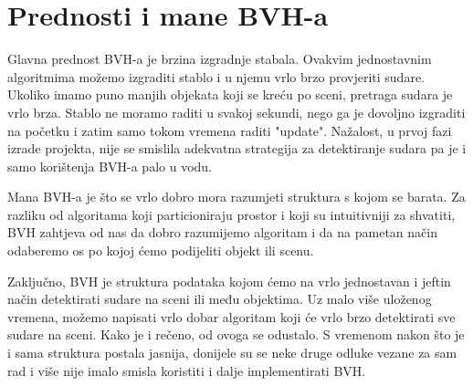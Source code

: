 \section{Prednosti i mane BVH-a}
Glavna prednost BVH-a je brzina izgradnje stabala. Ovakvim jednostavnim algoritmima možemo izgraditi stablo i u njemu vrlo brzo provjeriti sudare. Ukoliko imamo puno manjih objekata koji se kreću po sceni, pretraga sudara je vrlo brza. Stablo ne moramo raditi u svakoj sekundi, nego ga je dovoljno izgraditi na početku i zatim samo tokom vremena raditi "update". Nažalost, u prvoj fazi izrade projekta, nije se smislila adekvatna strategija za detektiranje sudara pa je i samo korištenja BVH-a palo u vodu. 

Mana BVH-a je što se vrlo dobro mora razumjeti struktura s kojom se barata. Za razliku od algoritama koji particioniraju prostor i koji su intuitivniji za shvatiti, BVH zahtjeva od nas da dobro razumijemo algoritam i da na pametan način odaberemo os po kojoj ćemo podijeliti objekt ili scenu. 

Zaključno, BVH je struktura podataka kojom ćemo na vrlo jednostavan i jeftin način detektirati sudare na sceni ili među objektima. Uz malo više uloženog vremena, možemo napisati vrlo dobar algoritam koji će vrlo brzo detektirati sve sudare na sceni. Kako je i rečeno, od ovoga se odustalo. S vremenom nakon što je i sama struktura postala jasnija, donijele su se neke druge odluke vezane za sam rad i više nije imalo smisla koristiti i dalje implementirati BVH.

 	
	
